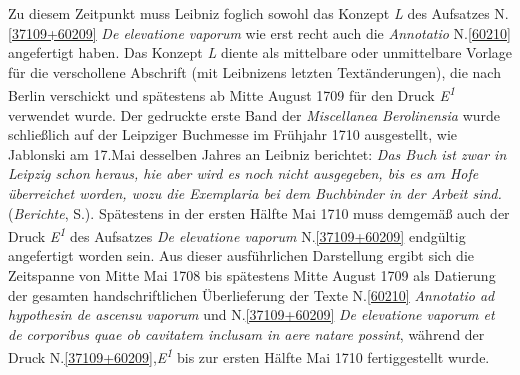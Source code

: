 Zu diesem Zeitpunkt muss Leibniz foglich sowohl das Konzept \textit{L} des Aufsatzes N.\;\ref{37109+60209} \textit{De elevatione vaporum} wie erst recht auch die \textit{Annotatio} N.\;\ref{60210} angefertigt haben.
Das Konzept \textit{L} diente als mittelbare oder unmittelbare Vorlage für die verschollene Abschrift (mit Leibnizens letzten Textänderungen), die nach Berlin verschickt und spätestens ab Mitte August 1709 für den Druck \textit{E\textsuperscript{1}} verwendet wurde.
\pend%
\pstart%
Der gedruckte erste Band der \textit{Miscellanea Berolinensia} wurde schließlich auf der Leipziger Buchmesse im Frühjahr 1710 ausgestellt, wie Jablonski am 17.\;Mai desselben Jahres an Leibniz berichtet: \textit{Das Buch ist zwar in Leipzig schon heraus, hie aber wird es noch nicht ausgegeben, bis es am Hofe überreichet worden, wozu die Exemplaria bei dem Buchbinder in der Arbeit sind.} (\textit{Berichte}, S.).\cite{02574}
Spätestens in der ersten Hälfte Mai 1710 muss demgemäß auch der Druck \textit{E\textsuperscript{1}} des Aufsatzes \textit{De elevatione vaporum} N.\;\ref{37109+60209} endgültig angefertigt worden sein.
\pend%
\pstart%
Aus dieser ausführlichen Darstellung ergibt sich die Zeitspanne von Mitte Mai 1708 bis spätestens Mitte August 1709 als Datierung der gesamten handschriftlichen Überlieferung der Texte N.\;\ref{60210} \textit{Annotatio ad hypothesin de ascensu vaporum} und N.\;\ref{37109+60209} \textit{De elevatione vaporum et de corporibus quae ob cavitatem inclusam in aere natare possint}, während der Druck N.\;\ref{37109+60209},\textit{E\textsuperscript{1}} bis zur ersten Hälfte Mai 1710 fertiggestellt wurde.%
%
%
%
\pend%
%
\frenchspacing%
\normalsize%
